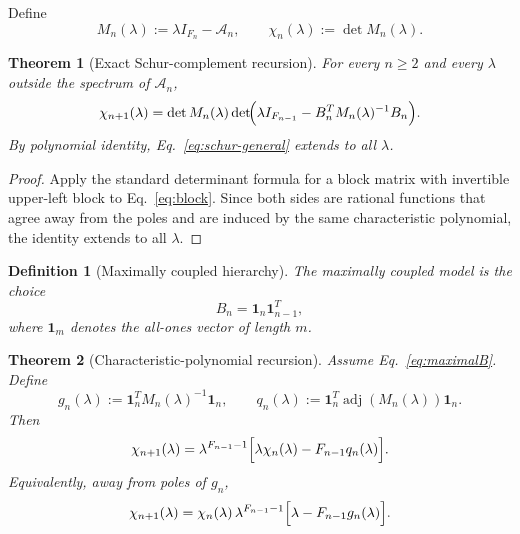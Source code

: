 \documentclass[
  aps,
  prd,
  reprint,
  superscriptaddress,
  nofootinbib,
  longbibliography,
  amsmath,
  amssymb
]{revtex4-2}
\newtheorem{theorem}{Theorem}
\newtheorem{definition}{Definition}
\theoremstyle{remark}
\newcommand{\ones}{\mathbf{1}}
\begin{document}
Define
\begin{equation}
M_n(\lambda):=\lambda I_{F_n}-\mathcal A_n,
\qquad
\chi_n(\lambda):=\det M_n(\lambda).
\label{eq:Mn}
\end{equation}

\begin{theorem}[Exact Schur-complement recursion]
\label{thm:schur-general}
For every $n\ge 2$ and every $\lambda$ outside the spectrum of $\mathcal A_n$,
\begin{equation}
\chi_{n+1}(\lambda)
=
\det M_n(\lambda)
\det\!\Bigl(\lambda I_{F_{n-1}}-B_n^T M_n(\lambda)^{-1}B_n\Bigr).
\label{eq:schur-general}
\end{equation}
By polynomial identity, Eq.~\eqref{eq:schur-general} extends to all $\lambda$.
\end{theorem}

\begin{proof}
Apply the standard determinant formula for a block matrix with invertible upper-left block to Eq.~\eqref{eq:block}. Since both sides are rational functions that agree away from the poles and are induced by the same characteristic polynomial, the identity extends to all $\lambda$.
\end{proof}

\begin{definition}[Maximally coupled hierarchy]
\label{def:max}
The maximally coupled model is the choice
\begin{equation}
B_n=\ones_n\ones_{n-1}^{T},
\label{eq:maximalB}
\end{equation}
where $\ones_m$ denotes the all-ones vector of length $m$.
\end{definition}

\begin{theorem}[Characteristic-polynomial recursion]
\label{thm:charrec}
Assume Eq.~\eqref{eq:maximalB}. Define
\begin{equation}
g_n(\lambda):=\ones_n^T M_n(\lambda)^{-1}\ones_n,
\qquad
q_n(\lambda):=\ones_n^T\operatorname{adj}(M_n(\lambda))\ones_n.
\label{eq:gnqn}
\end{equation}
Then
\begin{equation}
\chi_{n+1}(\lambda)
=
\lambda^{F_{n-1}-1}
\Bigl[\lambda\chi_n(\lambda)-F_{n-1}q_n(\lambda)\Bigr].
\label{eq:charrec}
\end{equation}
Equivalently, away from poles of $g_n$,
\begin{equation}
\chi_{n+1}(\lambda)
=
\chi_n(\lambda)
\,\lambda^{F_{n-1}-1}
\Bigl[\lambda-F_{n-1}g_n(\lambda)\Bigr].
\label{eq:charrec-resolvent}
\end{equation}
\end{theorem}
\end{document}
